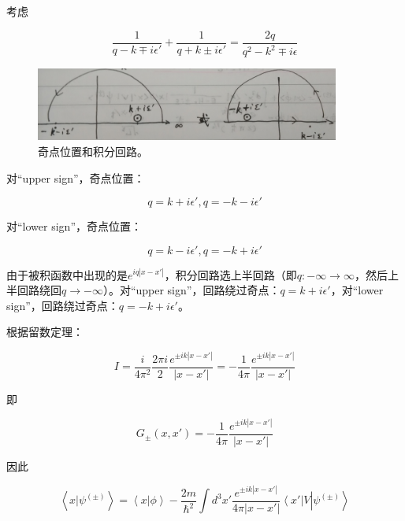考虑

\begin{equation}
\frac{1}{q - k \mp i\epsilon' } + \frac{1}{q + k \pm i \epsilon' } = \frac{2 q}{q^2 - k^2 \mp i \epsilon }
\end{equation}

\begin{figure}[htbp]
\begin{center}
\includegraphics[width=10cm]{Scattering/TheContour.png}
\caption{奇点位置和积分回路。}
\end{center}
\end{figure}


对“upper sign”，奇点位置：

\begin{equation}
q = k + i \epsilon' , q= - k - i \epsilon' 
\end{equation}

对“lower sign”，奇点位置：

\begin{equation}
q = k - i \epsilon' , q= - k + i \epsilon' 
\end{equation}

由于被积函数中出现的是$e^{i q |x - x'|}$，积分回路选上半回路（即$q: - \infty \to \infty$，然后上半回路绕回$q \to - \infty$）。对“upper sign”，回路绕过奇点：$q = k + i \epsilon'$，对“lower sign”，回路绕过奇点：$q= - k + i \epsilon'$。

根据留数定理：

\begin{equation}
I = \frac{i}{4 \pi^2 }\frac{2 \pi i}{2} \frac{e^{ \pm i k |x-x'|}}{|x-x'|}  = - \frac{1}{4 \pi} \frac{e^{ \pm i k |x-x'|}}{|x-x'|}
\end{equation}

即

\begin{equation}
G_{\pm} (x, x') = - \frac{1}{4 \pi} \frac{e^{\pm i k |x - x'|}}{|x - x'|}
\end{equation}

因此

\begin{equation}
\left\langle x | \psi^{(\pm)} \right\rangle = \left\langle x | \phi \right\rangle - \frac{2m}{\hbar^2} \int d^3 x' \frac{e^{\pm i k |x-x'|}}{4 \pi |x-x'| } \left\langle x' \right| V \left| \psi^{(\pm)} \right\rangle 
\end{equation}

